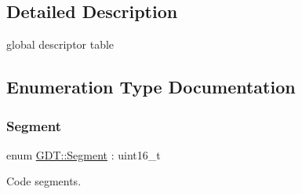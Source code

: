 \subsection{Detailed Description}
global descriptor table 

\subsection{Enumeration Type Documentation}
\mbox{\label{namespace_g_d_t_af2b09941ee46a489ebaccfed5c839154}} 
\subsubsection{\texorpdfstring{Segment}{Segment}}
{\footnotesize\ttfamily enum \hyperlink{namespace_g_d_t_af2b09941ee46a489ebaccfed5c839154}{G\+D\+T\+::\+Segment} \+: uint16\+\_\+t}



Code segments. 

